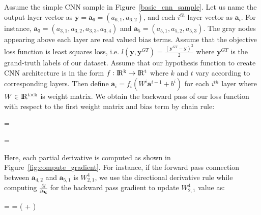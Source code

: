 Assume the simple CNN sample in Figure~\ref{basic_cnn_sample}. Let us name the output layer vector as $\textbf{y} = \textbf{a}_6 = (a_{6,1}, a_{6,2})$, and each $i^{th}$ layer vector as $\textbf{a}_{i}$. For instance, $\textbf{a}_{3} = (a_{3,1}, a_{3,2}, a_{3,3}, a_{3,4})$ and $\textbf{a}_{5} = (a_{5,1}, a_{5,2}, a_{5,3})$. The gray nodes appearing above each layer are real valued bias terms. Assume that the objective loss function is least squares loss, i.e. $l(\textbf{y}, \textbf{y}^{GT}) = \frac{(\textbf{y}^{GT} - \textbf{y})^{2}}{2}$ where $\textbf{y}^{GT}$ is the grand-truth labels of our dataset. Assume that our hypothesis function to create CNN architecture is in the form $f: \rm I\!R^{k} \rightarrow \rm I\!R^{t}$ where $k$ and $t$ vary according to corresponding layers. Then define $\textbf{a}_{i} = f_{i}(W^{i} \textbf{a}^{i-1} + b^{i})$ for each $i^{th}$ layer where $W \in \rm I\!R^{t \times k}$ is weight matrix. We obtain the backward pass of our loss function with respect to the first weight matrix and bias term by chain rule:

\be
\label{eq:compute_dl/dW}
 =  \times {} \times {} \times {} \times {} \times {}\:
\ee

\be
\label{eq:compute_dl/db}
 =  \times {} \times {} \times {} \times {} \times {}\:
\ee

Here, each partial derivative is computed as shown in Figure~\ref{fig:compute_gradient}. For instance, if the forward pass connection between $\textbf{a}_{4,2}$ and $\textbf{a}_{5,1}$ is $W^{4}_{2,1}$, we use the directional derivative rule while computing $\frac{\partial l}{\partial \textbf{a}_{6}}$ for the backward pass gradient to update $W^{4}_{2,1}$ value as:

\be
\label{eq:compute_specific_weight}
 =   \times {} \times {} = \Big (  \times {} +  \times {} \Big ) \times {} \:
\ee

